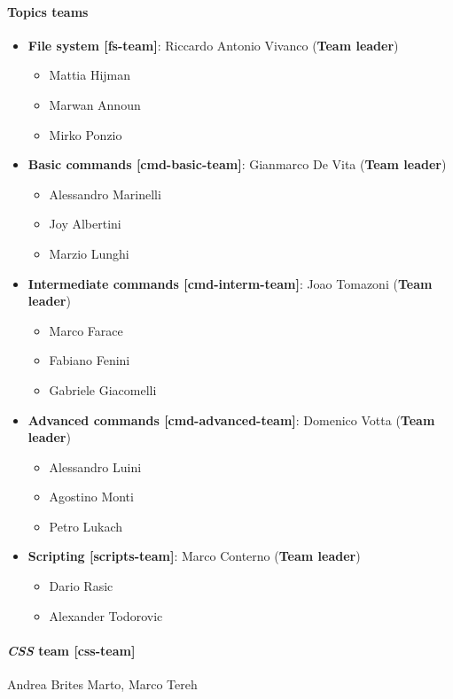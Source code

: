 \documentclass[hidelinks,12pt,a4paper,numbers=enddot]{scrartcl}
\begin{document}
\paragraph{Topics teams}
\begin{itemize}
    \item \textbf{File system {[}fs-team{]}}: Riccardo Antonio Vivanco (\textbf{Team leader})
      \begin{itemize}
      \item Mattia Hijman
      \item Marwan Announ
      \item Mirko Ponzio
      \end{itemize}
    \item \textbf{Basic commands {[}cmd-basic-team{]}}: Gianmarco De Vita (\textbf{Team leader})
      \begin{itemize}
      \item Alessandro Marinelli
      \item Joy Albertini
      \item Marzio Lunghi
      \end{itemize}
    \item \textbf{Intermediate commands {[}cmd-interm-team{]}}: Joao Tomazoni (\textbf{Team leader})
      \begin{itemize}
      \item Marco Farace
      \item Fabiano Fenini
      \item Gabriele Giacomelli
   \end{itemize}
    \item \textbf{Advanced commands {[}cmd-advanced-team{]}}: Domenico Votta (\textbf{Team leader})
      \begin{itemize}
	  \item Alessandro Luini
      \item Agostino Monti
	  \item Petro Lukach
      \end{itemize}
    \item \textbf{Scripting {[}scripts-team{]}}: Marco Conterno (\textbf{Team leader})
      \begin{itemize}
	  \item Dario Rasic
    	  \item Alexander Todorovic
  \end{itemize}
\end{itemize}

\paragraph{\emph{CSS} team {[}css-team{]}}
Andrea Brites Marto, Marco Tereh
\end{document}
